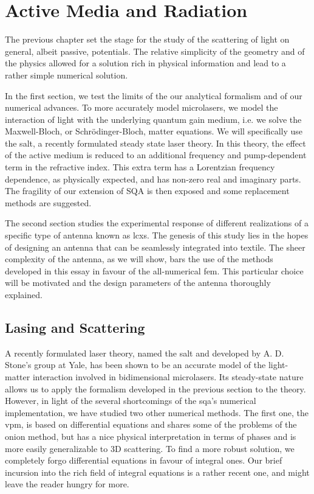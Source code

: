 \chapter{Active Media and Radiation}
The previous chapter set the stage for the study of 
the scattering of light on general, albeit passive, 
potentials. The relative simplicity of the geometry
and of the physics allowed for a solution rich 
in physical information and lead to a rather simple
numerical solution. 

In the first section, we test the limits of the our analytical formalism
and of our numerical advances. To more accurately model
microlasers, we model the interaction of light with the underlying
quantum gain medium, i.e. we solve the Maxwell-Bloch, or Schrödinger-Bloch, 
matter equations. We will specifically use the \gls{salt}, a recently 
formulated steady state laser theory. In this theory, the effect 
of the active medium is reduced to an additional frequency and pump-dependent
term in the refractive index. This extra term has a Lorentzian frequency
dependence, as physically expected, and has non-zero real and imaginary
parts. The fragility of our extension of SQA is then exposed and some replacement
methods are suggested. 

The second section studies the experimental response
of different realizations of a specific type of antenna
known as \glspl{lcx}. The genesis of this study lies in
the hopes of designing an antenna that can be seamlessly
integrated into textile. The sheer complexity of the
antenna, as we will show, bars the use of the methods developed
in this essay in favour of the all-numerical \gls{fem}. 
This particular choice will be motivated and the design 
parameters of the antenna thoroughly explained. 

\section{Lasing and Scattering}
A recently formulated laser theory, named the 
\gls{salt} and developed by A. D. Stone's group
at Yale, has been shown to be an accurate model 
of the light-matter interaction involved in bidimensional
microlasers. Its steady-state nature allows us to apply
the formalism developed in the previous section 
to the theory. However, in light of the several shortcomings
of the \gls{sqa}'s numerical implementation, we have studied 
two other numerical methods. The first one, the \gls{vpm}, is based on 
differential equations and shares some of the problems of 
the onion method, but has a nice physical interpretation
in terms of phases and is more easily generalizable to 
3D scattering. 
To find a more robust solution, we completely forgo 
differential equations in favour of integral ones. 
Our brief incursion into the rich field of integral equations
is a rather recent one, and might leave the reader hungry for more.

